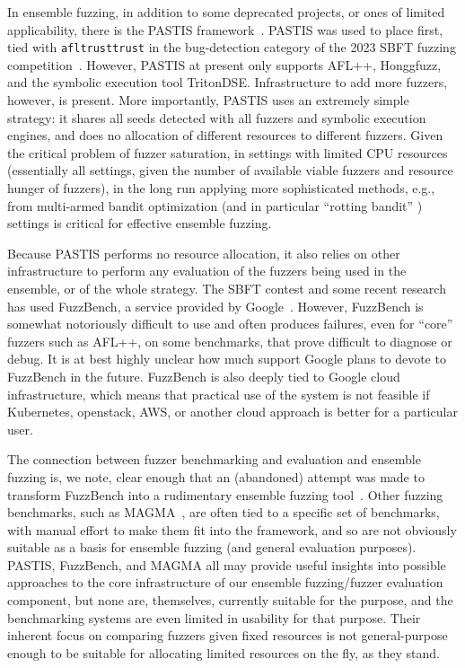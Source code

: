 In ensemble fuzzing, in addition to some deprecated projects, or ones of 
limited applicability, there is the PASTIS framework~\cite{pastis}.  PASTIS was used to place first, tied 
with {\tt afltrusttrust} in the bug-detection category of the 2023 SBFT fuzzing 
competition~\cite{toolcomp}.  However, PASTIS at present only supports
AFL++, Honggfuzz, 
and the symbolic execution tool TritonDSE.  Infrastructure to add more fuzzers, 
however, is present.  More importantly, PASTIS uses an extremely simple 
strategy:  it shares all seeds detected with all fuzzers and symbolic execution 
engines, and does no allocation of different resources to different fuzzers.  
Given the critical problem of fuzzer saturation, in settings with limited CPU 
resources (essentially all settings, given the number of available viable 
fuzzers and resource hunger of fuzzers), in the long run applying more 
sophisticated methods, e.g., from multi-armed bandit optimization (and in 
particular ``rotting bandit'' \cite{levine2017rotting}) settings is critical for effective 
ensemble fuzzing.

Because PASTIS performs no resource allocation, it also relies on other 
infrastructure to perform any evaluation of the fuzzers being used in the 
ensemble, or of the whole strategy.  The SBFT contest and some recent research 
has used FuzzBench, a service provided by Google~\cite{metzman2021fuzzbench}.  However, FuzzBench is 
somewhat notoriously difficult to use and often produces failures, even for 
``core'' fuzzers such as AFL++, on some benchmarks, that prove difficult 
to diagnose or debug.  It is at best highly unclear how much support Google 
plans to devote to FuzzBench in the future.  FuzzBench is also deeply
tied to Google cloud infrastructure, which means that practical use of
the system is not feasible if Kubernetes, openstack, AWS, or another
cloud approach is better for a particular user.

The connection between fuzzer 
benchmarking and evaluation and ensemble fuzzing is, we note, clear enough that 
an (abandoned) attempt was made to transform FuzzBench 
into a rudimentary ensemble fuzzing tool~\cite{fuzzbenchensemble}.   Other fuzzing benchmarks, such as 
MAGMA~\cite{MAGMA}, are often tied to a specific set of benchmarks, with manual effort to 
make them fit into the framework, and so are not obviously suitable as a basis 
for ensemble fuzzing (and general evaluation purposes).  PASTIS, FuzzBench, and 
MAGMA all may provide useful insights into possible approaches to the core 
infrastructure of our ensemble fuzzing/fuzzer evaluation component, but none 
are, themselves, currently suitable for the purpose, and the benchmarking 
systems are even limited in usability for that purpose.   Their
inherent focus on comparing fuzzers given fixed resources is not
general-purpose enough to be suitable for allocating limited resources
on the fly, as they stand.


